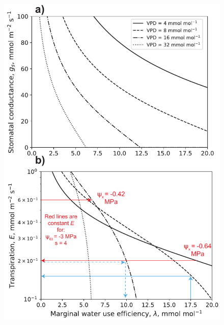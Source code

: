 \documentclass[utf8]{frontiersSCNS} %
\begin{document}
\begin{figure}[h]
    \begin{center}
         \includegraphics[scale=0.75]{g_E_lam_noon.pdf}   
    \end{center}
    \caption{}
    \label{fig:gs_lam}
\end{figure}
\end{document}
